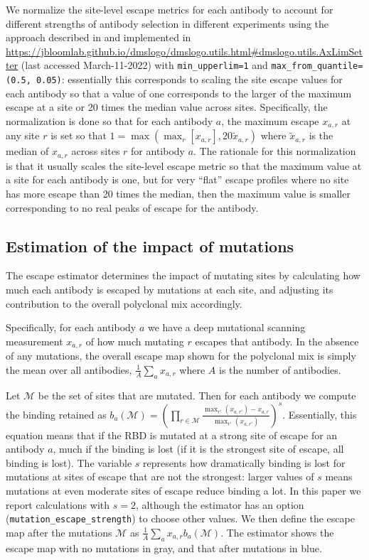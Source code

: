 \documentclass[9pt,twocolumn,twoside]{gsajnl_modified}
\begin{document}
{We normalize the site-level escape metrics for each antibody to account for different strengths of antibody selection in different experiments using the approach described in \citet{greaney2021comprehensive} and implemented in \url{https://jbloomlab.github.io/dmslogo/dmslogo.utils.html#dmslogo.utils.AxLimSetter} (last accessed March-11-2022) with \texttt{min\_upperlim=1} and \texttt{max\_from\_quantile=(0.5, 0.05)}: essentially this corresponds to scaling the site escape values for each antibody so that a value of one corresponds to the larger of the maximum escape at a site or 20 times the median value across sites.
Specifically, the normalization is done so that for each antibody $a$, the maximum escape $x_{a,r}$ at any site $r$ is set so that $1 = \max\left(\max_r \left[x_{a,r}\right], 20\tilde{x}_{a,r} \right)$ where $\tilde{x}_{a,r}$ is the median of $x_{a,r}$ across sites $r$ for antibody $a$.
The rationale for this normalization is that it usually scales the site-level escape metric so that the maximum value at a site for each antibody is one, but for very ``flat'' escape profiles where no site has more escape than 20 times the median, then the maximum value is smaller corresponding to no real peaks of escape for the antibody.


\subsection{Estimation of the impact of mutations}
The escape estimator determines the impact of mutating sites by calculating how much each antibody is escaped by mutations at each site, and adjusting its contribution to the overall polyclonal mix accordingly.

Specifically, for each antibody $a$ we have a deep mutational scanning measurement $x_{a,r}$ of how much mutating $r$ escapes that antibody.
In the absence of any mutations, the overall escape map shown for the polyclonal mix is simply the mean over all antibodies, $\frac{1}{A}\sum_a x_{a,r}$ where $A$ is the number of antibodies.

Let $\mathcal{M}$ be the set of sites that are mutated.
Then for each antibody we compute the binding retained as $b_a\left(\mathcal{M}\right) = \left(\prod\limits_{r \in \mathcal{M}} \frac{\max_{r'}\left(x_{a,r'}\right) - x_{a,r}}{\max_{r'}\left(x_{a,r'}\right)}\right)^s$. 
Essentially, this equation means that if the RBD is mutated at a strong site of escape for an antibody $a$, much if the binding is lost (if it is the strongest site of escape, all binding is lost).
The variable $s$ represents how dramatically binding is lost for mutations at sites of escape that are not the strongest: larger values of $s$ means mutations at even moderate sites of escape reduce binding a lot.
In this paper we report calculations with $s = 2$, although the estimator has an option (\texttt{mutation\_escape\_strength}) to choose other values.
We then define the escape map after the mutations $\mathcal{M}$ as $\frac{1}{A}\sum_a x_{a,r} b_a\left(\mathcal{M}\right)$.
The estimator shows the escape map with no mutations in gray, and that after mutations in blue.

}
\end{document}
